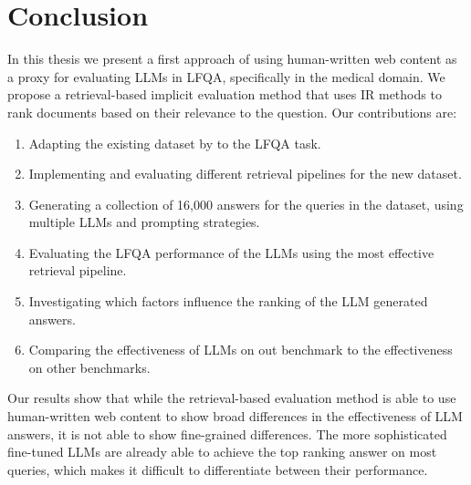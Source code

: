 \section{Conclusion}
In this thesis we present a first approach of using human-written web content as a proxy for evaluating LLMs in LFQA, specifically in the medical domain.
We propose a retrieval-based implicit evaluation method that uses IR methods to rank documents based on their relevance to the question.
Our contributions are:
\begin{enumerate}
    \item Adapting the existing dataset by \cite{goeuriot:2021:Consumer} to the LFQA task.
    \item Implementing and evaluating different retrieval pipelines for the new dataset.
    \item Generating a collection of 16,000 answers for the queries in the dataset, using multiple LLMs and prompting strategies.
    \item Evaluating the LFQA performance of the LLMs using the most effective retrieval pipeline.
    \item Investigating which factors influence the ranking of the LLM generated answers.
    \item Comparing the effectiveness of LLMs on out benchmark to the effectiveness on other benchmarks.
\end{enumerate}

Our results show that while the retrieval-based evaluation method is able to use human-written web content to show broad differences in the effectiveness of LLM answers, it is not able to show fine-grained differences.
The more sophisticated fine-tuned LLMs are already able to achieve the top ranking answer on most queries, which makes it difficult to differentiate between their performance.